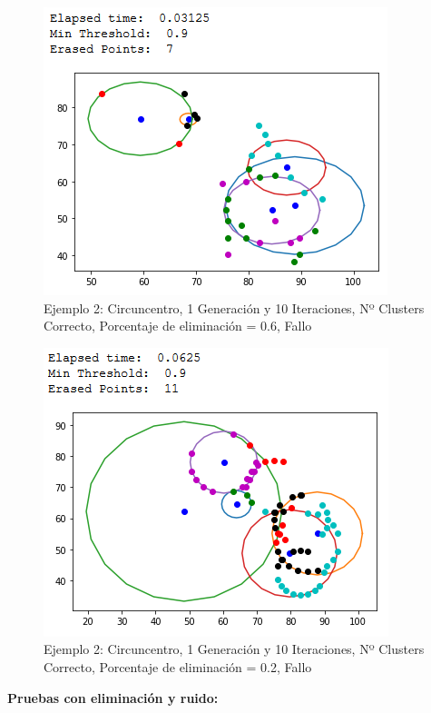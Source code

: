 \documentclass[conference,a4paper]{IEEEtran}
\begin{document}
\begin{figure}[H]
\centering
\includegraphics[scale=0.65]{Experimentacion/Ejemplo2/ej2_c_1_10_me_wrong}
\caption{Ejemplo 2: Circuncentro, 1 Generación y 10 Iteraciones,  Nº Clusters Correcto, Porcentaje de eliminación = 0.6, Fallo\\}
\end{figure}

\begin{figure}[H]
\centering
\includegraphics[scale=0.65]{Experimentacion/Ejemplo2/ej2_c_1_10_le_wrong}
\caption{Ejemplo 2: Circuncentro, 1 Generación y 10 Iteraciones,  Nº Clusters Correcto, Porcentaje de eliminación = 0.2, Fallo\\}
\end{figure}

\newpage
\textbf{Pruebas con eliminación y ruido:}\\
\end{document}
